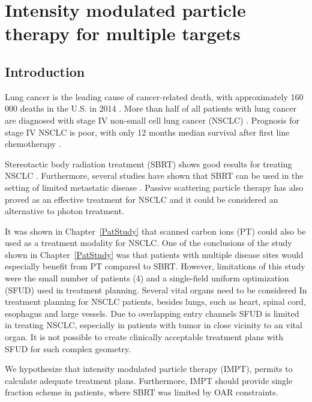\documentclass[type=dr, dr=rernat, accentcolor=tud7b,colorbacktitle, bigchapter, openright, twoside, 12pt ]{tudthesis}
\begin{document}
\chapter{Intensity modulated particle therapy for multiple targets}
\label{chapter:complex}
\minitoc

\section{Introduction}

Lung cancer is the leading cause of cancer-related death, with approximately 160 000 deaths in the U.S. in 2014 \cite{Siegel2014}.
More than half of all patients with lung cancer are diagnosed with stage IV non-small cell lung cancer (NSCLC) \cite{Ramalingam2008, Iyengar2014}.
Prognosis for stage IV NSCLC is poor, with only 12 months median survival after first line chemotherapy \cite{Socinski2013}. 

Stereotactic body radiation treatment (SBRT) shows good results for treating NSCLC \cite{Baumann2009, Fakiris2009, Grutters2010, Greco2011}. 
Furthermore, several studies have shown that SBRT can be used in the setting of limited metastatic 
disease \cite{Rusthoven2009, Villaruz2012, Salama2012, Iyengar2014}. 
Passive scattering particle therapy has also proved as an effective treatment for NSCLC \cite{Grutters2010, Tsujii2012} and it could be considered an alternative
to photon treatment.

It was shown in Chapter~\ref{PatStudy} that scanned carbon ions (PT) could also be used as a treatment modality for NSCLC. One of the conclusions of the study shown in Chapter~\ref{PatStudy} 
was that patients with multiple disease sites would especially benefit from PT compared to SBRT. However, limitations of this study were the small number of patients (4) and
a single-field uniform optimization (SFUD) used in treatment planning. Several vital organs need to be considered In treatment planning for NSCLC patients, besides lungs, such as heart, spinal cord, esophagus and large vessels.
Due to overlapping entry channels SFUD is limited in treating NSCLC, especially in patients with tumor in close vicinity to an vital organ.
It is not possible to create clinically acceptable treatment plans with SFUD for such complex geometry.

We hypothesize that intensity modulated particle therapy (IMPT), permits to calculate adequate treatment plans. Furthermore, IMPT 
should provide single fraction scheme in patients, where SBRT was limited by OAR constraints. 
\end{document}

